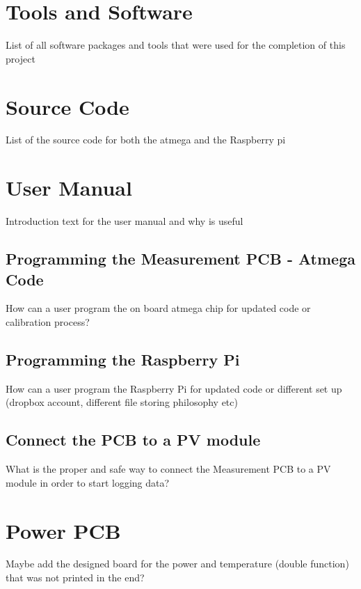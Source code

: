 \section{Tools and Software}
List of all software packages and tools that were used for the completion of this project

\section{Source Code}
List of the source code for both the atmega and the Raspberry pi

\section{User Manual}
Introduction text for the user manual and why is useful

\subsection{Programming the Measurement PCB - Atmega Code}
How can a user program the on board atmega chip for updated code or calibration process?

\subsection{Programming the Raspberry Pi}
How can a user program the Raspberry Pi for updated code or different set up (dropbox account, different file storing philosophy etc)

\subsection{Connect the PCB to a PV module}
What is the proper and safe way to connect the Measurement PCB to a PV module in order to start logging data?

\section{Power PCB}
Maybe add the designed board for the power and temperature (double function) that was not printed in the end?